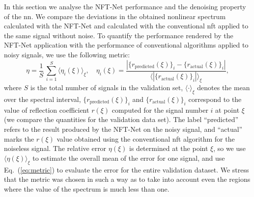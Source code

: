 In this section we analyse the NFT-Net performance and the denoising property of the \acrshort{nn}. We compare the deviations in the obtained nonlinear spectrum calculated with the NFT-Net and calculated with the conventional \acrshort{nft} applied to the same signal without noise. To quantify the performance rendered by the NFT-Net application with the performance of conventional algorithms applied to noisy signals, we use the following metric:
\begin{equation}
    \eta = \frac{1}{S} \, \sum_{i = 1}^{S} \langle \eta_i(\xi) \rangle_{\xi},
    \quad
    \eta_i(\xi) = \frac{|\{r_\text{predicted}(\xi)\}_i - \{r_\text{actual}(\xi)\}_i| }{\langle |\{r_\text{actual}(\xi)\}_i| \rangle_{\xi}} {,}
    \label{eq:metric}
\end{equation}
where $S$ is the total number of signals in the validation set, $\langle \cdot \rangle_{\xi}$ denotes the mean over the spectral interval, 
$\{r_{\text{predicted}}(\xi)\}_{i}$ and $\{r_{\text{actual}}(\xi)\}_{i}$ correspond to the value of reflection coefficient $r(\xi)$ computed for the signal number $i$ at point $\xi$ (we compare the quantities for the validation data set).  The label ``predicted'' refers to the result produced by the NFT-Net on the noisy signal, and ``actual'' marks the $r(\xi)$ value obtained using the conventional \acrshort{nft} algorithm\cite{FNFT2018} for the noiseless signal.
The relative error $\eta(\xi)$ is determined at the point $\xi$, so we use $\langle \eta(\xi) \rangle_{\xi}$ to estimate the overall mean of the error for one signal, and use Eq.~(\ref{eq:metric})  to evaluate the error for the entire validation dataset.
We stress that the metric was chosen in such a way as to take into account even the regions where the value of the spectrum is much less than one.


